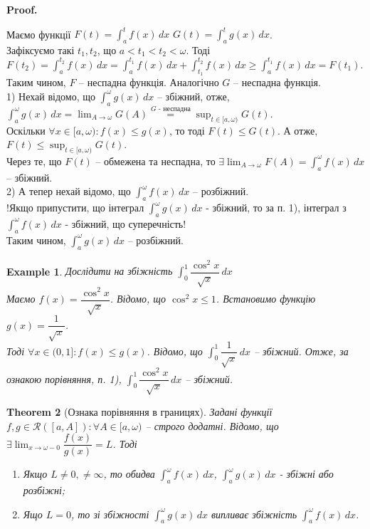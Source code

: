 \documentclass[a4paper, 10pt]{article}
\makeatletter
\def\huge{\displaystyle}
\def\qed{$\blacksquare$}
\theoremstyle{theoremdd}
\newtheorem{theorem}{Theorem}[subsection]
\theoremstyle{theoremdd}
\theoremstyle{theoremdd}
\theoremstyle{theoremdd}
\theoremstyle{theoremdd}
\newtheorem{example}[theorem]{Example}
\theoremstyle{theoremdd}
\theoremstyle{theoremdd}
\theoremstyle{theoremdd}
\theoremstyle{theoremdd}
\renewenvironment{proof}[1][Proof.\\]{\par
\pushQED{\hfill \qed}%
\normalfont \topsep6\p@\@plus6\p@\relax
\trivlist
\item\relax
{\bfseries
#1\@addpunct{.}}\hspace\labelsep\ignorespaces
}{%
\popQED\endtrivlist\@endpefalse
}
\makeatother
\begin{document}
\begin{proof}
Маємо функції $F(t) = \huge\int_a^t f(x)\,dx$ \hspace{0.5cm} $G(t) = \huge\int_a^t g(x)\,dx$.\\
Зафіксуємо такі $t_1,t_2$, що $a < t_1 < t_2 < \omega$. Тоді\\
$F(t_2) = \huge\int_a^{t_2} f(x)\,dx = \huge\int_a^{t_1} f(x)\,dx + \huge\int_{t_1}^{t_2} f(x)\,dx \geq \huge\int_a^{t_1} f(x)\,dx = F(t_1)$.\\
Таким чином, $F$ -- неспадна функція. Аналогічно $G$ -- неспадна функція.\\
1) Нехай відомо, що $\huge\int_a^\omega g(x)\,dx$ -- збіжний, отже,\\
$\huge\int_a^\omega g(x)\,dx = \huge \lim_{A \to \omega} G(A) \overset{G\text{ - неспадна}}{=} \sup_{t \in [a,\omega)} G(t)$.\\
Оскільки $\forall x \in [a,\omega): f(x) \leq g(x)$, то тоді $F(t) \leq G(t)$. А отже, $F(t) \leq \huge \sup_{t \in [a,\omega)} G(t)$.\\
Через те, що $F(t)$ -- обмежена та неспадна, то $\huge\exists \lim_{A \to \omega} F(A) = \int_a^\omega f(x)\,dx$ -- збіжний.\\
2) А тепер нехай відомо, що $\huge\int_a^\omega f(x)\,dx$ -- розбіжний.\\
!Якщо припустити, що інтеграл $\huge\int_a^\omega g(x)\,dx$ - збіжний, то за п. 1), інтеграл з $\huge\int_a^\omega f(x)\,dx$ - збіжний, що суперечність!\\
Таким чином, $\huge\int_a^\omega g(x)\,dx$ -- розбіжний.
\end{proof}

\begin{example}
Дослідити на збіжність $\huge\int_0^1 \dfrac{\cos^2 x}{\sqrt{x}}\,dx$\\
Маємо $f(x) = \dfrac{\cos^2 x}{\sqrt{x}}$. Відомо, що $\cos^2 x \leq 1$. Встановимо функцію $g(x) = \dfrac{1}{\sqrt{x}}$.\\Тоді $\forall x \in (0,1]: f(x) \leq g(x)$. Відомо, що $\huge\int_0^1 \dfrac{1}{\sqrt{x}}\,dx$ -- збіжний. Отже, за ознакою порівняння, п. 1), $\huge\int_0^1 \dfrac{\cos^2 x}{\sqrt{x}}\,dx$ -- збіжний.
\end{example}

\begin{theorem}[Ознака порівняння в границях]
Задані функції $f,g \in \mathcal{R}([a,A]): \forall A \in [a,\omega)$ -- строго додатні. Відомо, що $\exists \huge \lim_{x \to \omega-0} \dfrac{f(x)}{g(x)} = L$. Тоді
\begin{enumerate}[nosep,wide=0pt,label={\arabic*)}]
\item Якщо $L \neq 0, \neq \infty$, то обидва $\huge\int_a^\omega f(x)\,dx$, $\huge\int_a^\omega g(x)\,dx$ - збіжні або розбіжні;
\item Ящо $L = 0$, то зі збіжності $\huge\int_a^\omega g(x)\,dx$ випливає збіжність $\huge\int_a^\omega f(x)\,dx$.
\end{enumerate}
\end{theorem}
\end{document}
